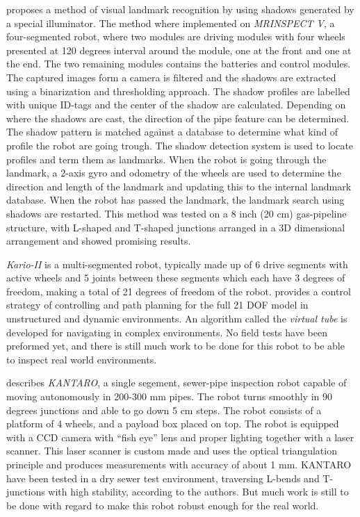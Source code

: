 \cite{MRINSPECT-V} proposes a method of visual landmark recognition by using shadows
generated by a special illuminator. The method where implemented on \emph{MRINSPECT V}, a
four-segmented robot, where two modules are driving modules with four wheels presented at
120 degrees interval around the module, one at the front and one at the end. The two
remaining modules contains the batteries and control modules. 
The captured images form a camera is filtered and the
shadows are extracted using a binarization and thresholding approach. The shadow profiles are
labelled with unique ID-tags and the center of the shadow are calculated. Depending on
where the shadows are cast, the direction of the pipe feature can be determined. The
shadow pattern is matched against a database to determine what kind of profile the robot
are going trough. The shadow detection system is used to locate profiles and term them as
landmarks. When the robot is going through the landmark, a 2-axis gyro and odometry of
the wheels are used to determine the direction and length of the landmark and updating
this to the internal landmark database. When the robot has passed the landmark, the 
landmark search using shadows are restarted. This method was tested on a 8 inch (20 cm)
gas-pipeline structure, with L-shaped and T-shaped junctions arranged in a 3D dimensional
arrangement and showed promising results. 


\emph{Kario-II} is a multi-segmented robot, typically made up of 6 drive segments with
active wheels and 5 joints between these segments which each have 3 degrees of freedom,
making a total of 21 degrees of freedom of the robot. \cite{Kairo-II} provides a control
strategy of controlling and path planning for the full 21 DOF model in unstructured and
dynamic environments. An algorithm called the \emph{virtual tube} is developed for
navigating in complex environments. No field tests have been preformed yet, and there is
still much work to be done for this robot to be able to inspect real world environments. 


\cite{KANTARO} describes \emph{KANTARO}, a single segement, sewer-pipe inspection robot 
capable of moving autonomously in 200-300 mm pipes. The robot turns smoothly in 90 degrees 
junctions and able to go down 5 cm steps. The robot consists of a platform of 4 wheels,
and a payload box placed on top. The robot is equipped with a CCD camera with ``fish eye''
lens and proper lighting together with a laser scanner. This laser scanner is custom made
and uses the optical triangulation principle and produces measurements with accuracy
of about 1 mm. KANTARO have been tested in a dry sewer test environment, traversing
L-bends and T-junctions with high stability, according to the authors. But much work is still
to be done with regard to make this robot robust enough for the real world. 


